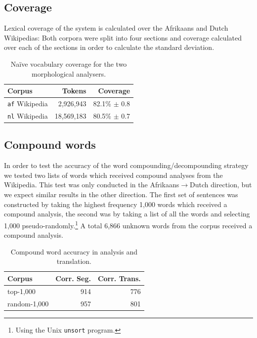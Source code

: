 \documentclass[11pt]{article}
\begin{document}
\subsection{Coverage}

Lexical coverage of the system is calculated over the Afrikaans and Dutch Wikipedias:
Both corpora were split into four sections and coverage calculated over each of the 
sections in order to calculate the standard deviation.

\begin{table}
  \begin{center}
  \begin{tabular}{|l|r|r|}
   \hline
   {\bf Corpus}           & {\bf Tokens}    & {\bf Coverage}\\
   \hline
   {\tt af} Wikipedia     & 2,926,943       & 82.1\% $\pm$ 0.8 \\
   \hline
   {\tt nl} Wikipedia     & 18,569,183      & 80.5\% $\pm$ 0.7 \\
   \hline
  \end{tabular}
    \caption{Na\"ive vocabulary coverage for the two morphological analysers.}
    \label{table:coverage}
  \end{center}
\end{table}

\subsection{Compound words}

In order to test the accuracy of the word compounding/decompounding strategy
we tested two lists of words which received compound analyses from 
the Wikipedia. This test was only conducted in the Afrikaans$\rightarrow$Dutch
direction, but we expect similar results in the other direction. The first
set of sentences was constructed by taking the highest frequency 1,000 words which received 
a compound analysis, the second was by taking a list of all the words and selecting
1,000 pseudo-randomly.\footnote{Using the Unix {\small {\tt unsort}} program.} A total 
6,866 unknown words from the corpus received a compound analysis.

\begin{table}
  \begin{center}
  \begin{tabular}{|l|r|r|}
   \hline
   {\bf Corpus}    & {\bf Corr. Seg.}    & {\bf Corr. Trans.}\\
   \hline
   top-1,000       & 914                 &  776 \\ 
   \hline
   random-1,000    & 957                 &  801 \\ 
   \hline
  \end{tabular}
    \caption{Compound word accuracy in analysis and translation.}
    \label{table:compounds}
  \end{center}
\end{table}
\end{document}
